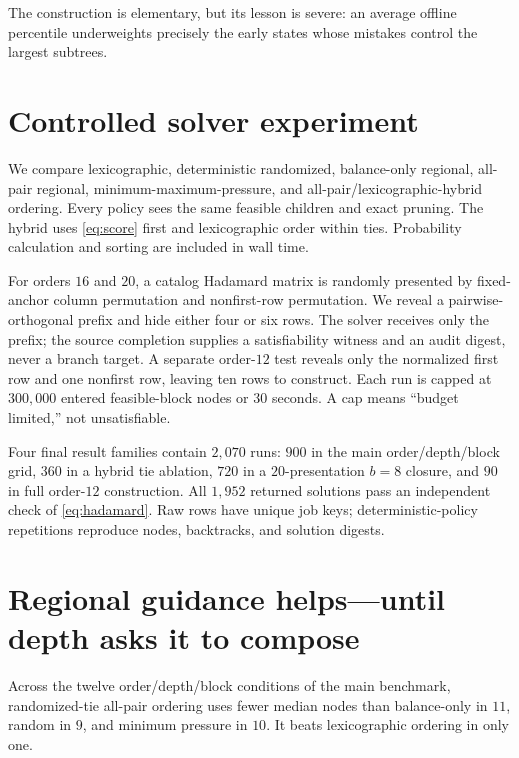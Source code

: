 \documentclass[10pt,twoside]{article}
\theoremstyle{noteplain}
\theoremstyle{definition}
\begin{document}
The construction is elementary, but its lesson is severe: an average offline percentile underweights precisely the early states whose mistakes control the largest subtrees.

\section{Controlled solver experiment}

We compare lexicographic, deterministic randomized, balance-only regional, all-pair regional, minimum-maximum-pressure, and all-pair/lexicographic-hybrid ordering.  Every policy sees the same feasible children and exact pruning.  The hybrid uses \eqref{eq:score} first and lexicographic order within ties.  Probability calculation and sorting are included in wall time.

For orders $16$ and $20$, a catalog Hadamard matrix is randomly presented by fixed-anchor column permutation and nonfirst-row permutation.  We reveal a pairwise-orthogonal prefix and hide either four or six rows.  The solver receives only the prefix; the source completion supplies a satisfiability witness and an audit digest, never a branch target.  A separate order-$12$ test reveals only the normalized first row and one nonfirst row, leaving ten rows to construct.  Each run is capped at $300{,}000$ entered feasible-block nodes or $30$ seconds.  A cap means ``budget limited,'' not unsatisfiable.

Four final result families contain $2{,}070$ runs: $900$ in the main order/depth/block grid, $360$ in a hybrid tie ablation, $720$ in a $20$-presentation $b=8$ closure, and $90$ in full order-$12$ construction.  All $1{,}952$ returned solutions pass an independent check of \eqref{eq:hadamard}.  Raw rows have unique job keys; deterministic-policy repetitions reproduce nodes, backtracks, and solution digests.

\section{Regional guidance helps---until depth asks it to compose}

Across the twelve order/depth/block conditions of the main benchmark, randomized-tie all-pair ordering uses fewer median nodes than balance-only in $11$, random in $9$, and minimum pressure in $10$.  It beats lexicographic ordering in only one.
\end{document}
